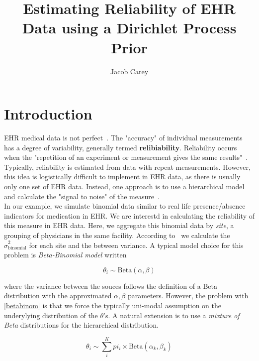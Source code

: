 \documentclass{article}
\begin{document}
\title{Estimating Reliability of EHR Data using a Dirichlet Process Prior}
\author{Jacob Carey}

\maketitle

\section{Introduction}

EHR medical data is not perfect~\cite{kanger2014}. The "accuracy" of individual measurements has a degree of variability, generally termed \textbf{relibiability}. Reliability occurs when the "repetition of an experiment or measurement gives the same results"~\cite{porta2008}.  Typically, reliability is estimated from data with repeat measurements. However, this idea is logistically difficult to implement in EHR data, as there is usually only one set of EHR data. Instead, one approach is to use a hierarchical model and calculate the "signal to noise" of the measure~\cite{Adams2009}. \\

In our example, we simulate binomial data similar to real life presence/absence indicators for medication in EHR. We are interestd in calculating the reliability of this measure in EHR data. Here, we aggregate this binomial data by \textit{site}, a grouping of physicians in the same facility. According to~\cite{Adams2009} we calculate the $\hat{\sigma}^2_{\text{binomial}}$ for each site and the between variance. A typical model choice for this problem is \textit{Beta-Binomial model} written

\begin{equation}\label{betabinom}
\theta_i \sim \text{Beta}(\alpha, \beta)
\end{equation}

where the variance between the souces follows the definition of a Beta distribution with the approximated $\alpha, \beta$ parameters. However, the problem with \eqref{betabinom} is that we force the typically uni-modal assumption on the underylying distribution of the $\theta$'s. A natural extension is to use a \textit{mixture of Beta} distributions for the hierarchical distribution.

\begin{equation}\label{eq:finitemix-betabinom}
\theta_i \sim \sum_i^K pi_i \times \text{Beta}(\alpha_k, \beta_k)
\end{equation}
\end{document}
